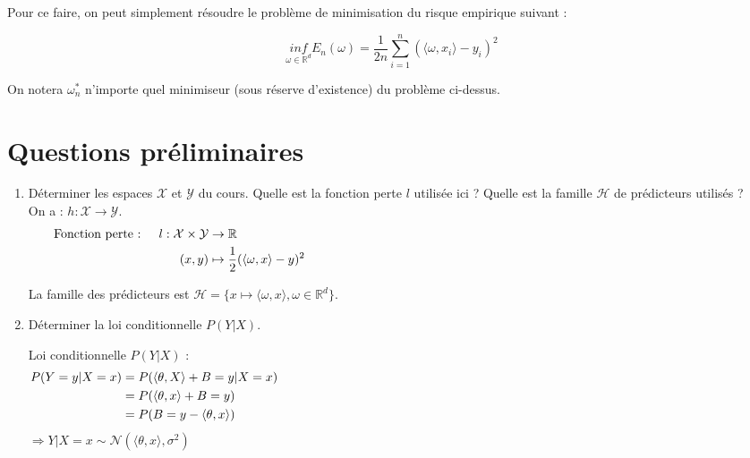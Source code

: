 \documentclass[12pt,a4paper]{article}
\begin{document}
Pour ce faire, on peut simplement résoudre le problème de minimisation du risque empirique suivant :

\begin{equation}
    \underset{\omega \in \mathbb{R}^d}{inf} E_n(\omega) = \frac{1}{2n} \sum_{i = 1}^{n} (\langle \omega, x_i \rangle - y_i)^2
    \label{eq:1}
\end{equation}

On notera $\omega_n^*$ n’importe quel minimiseur (sous réserve d’existence) du problème ci-dessus.

\section{Questions préliminaires}

\begin{enumerate}
    \color{black}
    \item Déterminer les espaces $\mathcal{X}$ et $\mathcal{Y}$ du cours.
    Quelle est la fonction perte $l$ utilisée ici ?
    Quelle est la famille $\mathcal{H}$ de prédicteurs utilisés ?\\

    \color{blue}
    On a : $h : \mathcal{X} \rightarrow \mathcal{Y}$.
    \begin{align*}
        \text{Fonction perte : } \quad l : \mathcal{X} \times \mathcal{Y} &\rightarrow \mathbb{R} \hspace{14.5cm}\\
        (x, y) &\mapsto \frac{1}{2} (\langle \omega, x \rangle - y)^2
    \end{align*}

    La famille des prédicteurs est $\mathcal{H} = \{x \mapsto \langle \omega, x \rangle, \omega \in \mathbb{R}^d\}$.\\
    

    \color{black}
    \item Déterminer la loi conditionnelle $P(Y | X)$.

    \color{blue}
    Loi conditionnelle $P(Y | X)$ :
    \begin{align*}
        P(Y = y | X = x) &= P(\langle \theta, X \rangle + B = y | X = x) \hspace{14.5cm}\\
        &= P(\langle \theta, x \rangle + B = y) \\
        &= P(B = y - \langle \theta, x \rangle)
    \end{align*}
    $\Rightarrow Y | X = x \sim \mathcal{N}(\langle \theta, x \rangle, \sigma^2)$\\



\end{enumerate}
\end{document}
